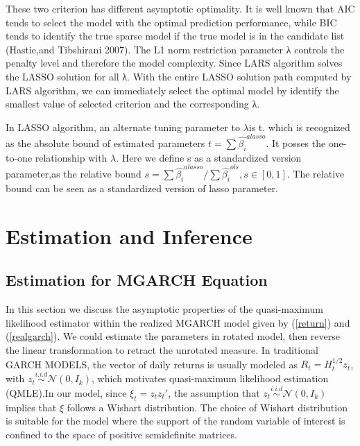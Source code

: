 \documentclass[titlepage,11pt]{article}
\begin{document}
These two criterion has different asymptotic optimality. It is well known that AIC tends to select the model with the optimal prediction performance, while BIC tends to identify the true sparse model if the true model is in the candidate list (Hastie,and Tibshirani  2007). The L1 norm restriction parameter λ controls the penalty level and therefore the model complexity. Since LARS algorithm solves the LASSO solution for all λ. With the entire LASSO solution path computed by LARS algorithm, we can immediately select the optimal model by identify the smallest value of selected criterion and the corresponding λ.  

In LASSO algorithm, an alternate tuning parameter to $\lambda$is  t. which is recognized as the absolute bound of estimated parameters $t =\sum \hat{\beta_i}^{alasso}$. It posses the one-to-one relationship with $\lambda$.  Here we define s as a standardized version parameter,as the relative bound $s =\sum\hat{\beta_i}^{alasso}/\sum \hat{\beta_i}^{ols}, s\in [0,1]$. The relative bound can be seen as a standardized version of lasso parameter. 





\section{Estimation and Inference}
\subsection{Estimation for MGARCH Equation}
In this section we discuss the asymptotic properties of the quasi-maximum likelihood estimator within the realized MGARCH model given by (\ref{return}) and (\ref{realgarch}). We could estimate the parameters in rotated model, then reverse the linear transformation to retract the unrotated measure.
In traditional GARCH MODELS, the vector of daily returns is usually modeled as $R_t=H_t^{1/2} z_t$, with $z_t \overset{i.i.d} {\sim} \mathcal{N}(0,I_k)$, which motivates quasi-maximum likelihood estimation (QMLE).In our model, since $\xi_t = z_t z_t'$, the assumption that $z_t \overset{i.i.d} {\sim} \mathcal{N}(0,I_k)$ implies that $\xi$ follows a Wishart distribution. The choice of Wishart distribution is suitable for the model where the support of the random variable of interest is confined to the space of positive semidefinite matrices. 
\end{document}
